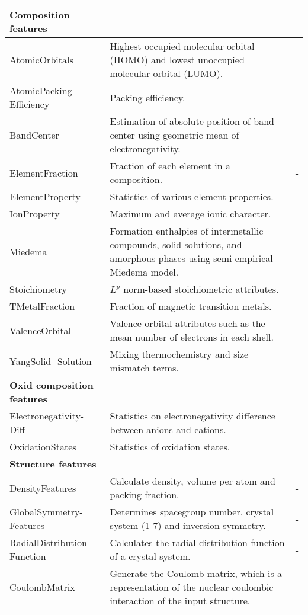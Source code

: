 \begin{center}
\begin{longtable}{M{3.0cm} M{6.0cm} M{2.5cm}}
  \hline
  \hline
  \textbf{Composition features} & & \\
  \hline
  AtomicOrbitals & Highest occupied molecular orbital (HOMO) and lowest unoccupied molecular orbital (LUMO). & \cite{Kotochigova1997}  \\
  AtomicPacking- Efficiency & Packing efficiency. & \cite{Laws2015}  \\
  BandCenter & Estimation of absolute position of band center using geometric mean of electronegativity. & \cite{Butler1978} \\
  ElementFraction & Fraction of each element in a composition. & -  \\
  ElementProperty & Statistics of various element properties. & \cite{Ong2013,Ward2016, Deml2016}  \\
  IonProperty & Maximum and average ionic character. & \cite{Ward2016} \\
  Miedema & Formation enthalpies of intermetallic compounds, solid solutions, and amorphous phases using semi-empirical Miedema model. & \cite{Weeber1987} \\
  Stoichiometry & $L^p$ norm-based stoichiometric attributes. & \cite{Ward2016} \\
  TMetalFraction & Fraction of magnetic transition metals. & \cite{Deml2016}  \\
  ValenceOrbital & Valence orbital attributes such as the mean number of electrons in each shell. & \cite{Ward2016}  \\
  YangSolid- Solution & Mixing thermochemistry and size mismatch terms. & \cite{Yang2012} \\
  \hline
  \textbf{Oxid composition features} &  &  \\
  \hline
  Electronegativity- Diff & Statistics on electronegativity difference between anions and cations. & \cite{Deml2016} \\
  OxidationStates & Statistics of oxidation states. & \cite{Deml2016}  \\
  \hline
  \textbf{Structure features} & & \\
  \hline
  DensityFeatures & Calculate density, volume per atom and packing fraction. & - \\
  GlobalSymmetry- Features & Determines spacegroup number, crystal system (1-7) and inversion symmetry. & - \\
  RadialDistribution- Function & Calculates the radial distribution function of a crystal system. & - \\
  CoulombMatrix & Generate the Coulomb matrix, which is a representation of the nuclear coulombic interaction of the input structure. & \cite{Rupp2012}  \\

\end{longtable}
\end{center}
